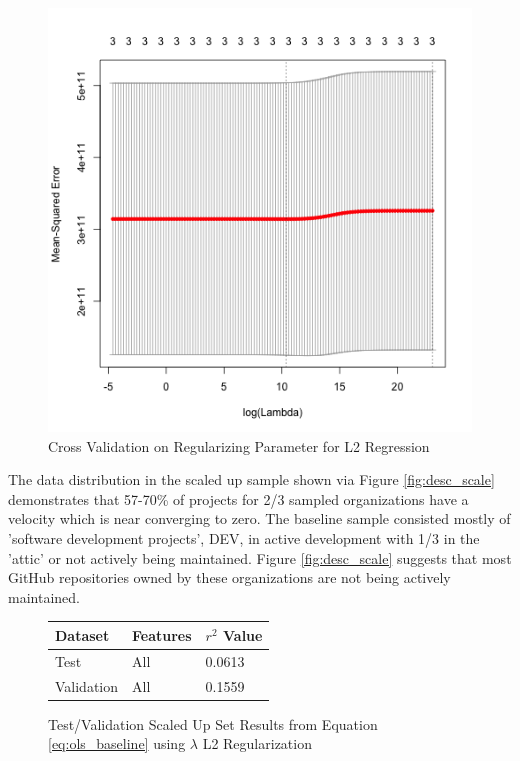 \documentclass{article}
\begin{document}
\begin{figure}[h]
  \centering
  \includegraphics[scale=0.5]{f5}
  \caption{Cross Validation on Regularizing Parameter for L2 Regression}
  \label{fig:l2_crossval}
\end{figure}

The data distribution in the scaled up sample shown via Figure
\ref{fig:desc_scale} demonstrates that 57-70\% of projects for 2/3 sampled
organizations have a velocity which is near converging to zero. The baseline
sample consisted mostly of 'software development projects', DEV, in active
development with 1/3 in the 'attic' or not actively being maintained.
Figure \ref{fig:desc_scale} suggests that most GitHub repositories owned
by these organizations are not being actively maintained. 


\begin{figure}[h]
  \centering
  \begin{tabular}{ l|l|l }
    Dataset & Features & $r^2$ Value \\
    \hline
    Test       & All        & 0.0613 \\
    Validation & All        & 0.1559 \\
  \end{tabular}
  \caption{Test/Validation Scaled Up Set Results from Equation
    \ref{eq:ols_baseline} using $\lambda$ L2 Regularization}
  \label{fig:ridge_scale}
\end{figure}
\end{document}
